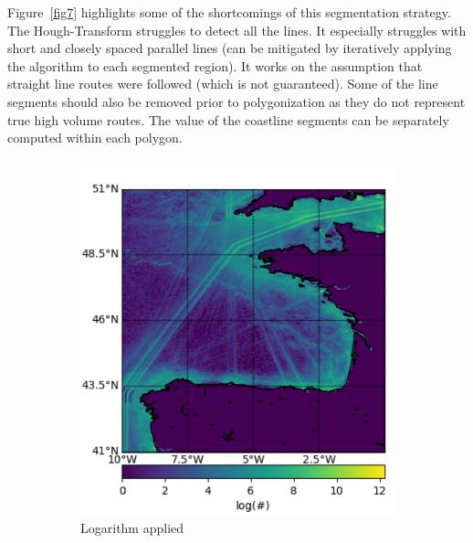 \documentclass{article}
\begin{document}
Figure~\ref{fig7} highlights some of the shortcomings of this segmentation strategy. The Hough-Transform struggles to detect all 
the lines. It especially struggles with short and closely spaced parallel lines (can be mitigated by iteratively applying the algorithm to each segmented region). It works on the assumption that straight line routes were followed (which is not guaranteed). Some of the line segments should also be removed prior to polygonization as they do not 
represent true high volume routes. The value of the coastline segments can be separately computed within each polygon.
 
\begin{figure}[h] 
  \begin{subfigure}[b]{0.5\linewidth}
    \centering
    \includegraphics[width=0.8\linewidth]{CELTICcrop.pdf} 
    \caption{Logarithm applied} 
    \label{fig7:a} 
    \vspace{4ex}
  \end{subfigure}%
  \begin{subfigure}[b]{0.5\linewidth}
    \centering

\end{subfigure}
\end{figure}
\end{document}
